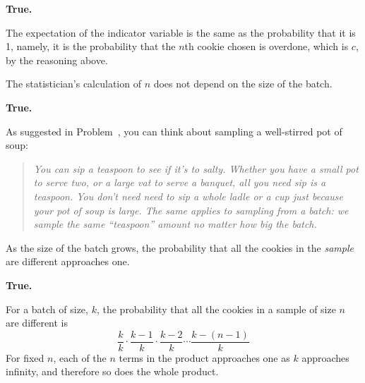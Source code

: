 \begin{problem}
\begin{solution}
\textbf{True.}

  The expectation of the indicator variable is the same as the probability
  that it is 1, namely, it is the probability that the $n$th cookie chosen
  is overdone, which is $c$, by the reasoning above.
\end{solution}

\ppart The statistician's calculation of $n$ does not depend on the size of the batch.


\begin{solution}
\textbf{True.}

As suggested in Problem~, you
can think about sampling a well-stirred pot of soup:
\begin{quote}
\emph{ You can sip a teaspoon to see if it's to salty.  Whether you
  have a small pot to serve two, or a large vat to serve a banquet,
  all you need sip is a teaspoon.  You don't need need to sip a whole
  ladle or a cup just because your pot of soup is large.  The same
  applies to sampling from a batch: we sample the same
  ``teaspoon'' amount no matter how big the batch.  }
\end{quote}

\end{solution}

\ppart As the size of the batch grows, the probability that all the
cookies in the \emph{sample} are different approaches one.

\begin{solution}
\textbf{True.}

  For a batch of size, $k$, the probability that all the cookies in
  a sample of size $n$ are different is
  \[
  \frac{k}{k}\cdot \frac{k-1}{k}\cdot \frac{k-2}{k} \cdots \frac{k-(n-1)}{k}
  \]
  For fixed $n$, each of the $n$ terms in the product approaches one
  as $k$ approaches infinity, and therefore so does the whole product.
\end{solution}

\eparts

\end{problem}



\endinput
